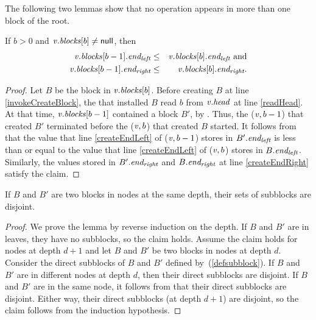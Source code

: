 The following two lemmas show that no operation appears in more than one block of the root.
\begin{lemma} \label{lem::headProgress}
 If $b>0$ and $\mbox{\textnormal{\textit{v}}}.\mbox{\textit{blocks}}[b] \neq \mbox{\sf null}$, then
 \begin{eqnarray*}
 \mbox{\textnormal{\textit{v}}}.\mbox{\textit{blocks}}[b-1].\mbox{\textit{end\textsubscript{left}}} &\leq& \mbox{\textnormal{\textit{v}}}.\mbox{\textit{blocks}}[b].\mbox{\textit{end\textsubscript{left}}} \mbox{ and}\\
 \mbox{\textnormal{\textit{v}}}.\mbox{\textit{blocks}}[b-1].\mbox{\textit{end\textsubscript{right}}} &\leq& \mbox{\textnormal{\textit{v}}}.\mbox{\textit{blocks}}[b].\mbox{\textit{end\textsubscript{right}}}.
 \end{eqnarray*}
\end{lemma}
\begin{proof}
Let $B$ be the block in $\mbox{\textnormal{\textit{v}}}.\mbox{\textit{blocks}}[b]$.
Before creating $B$ at line \ref{invokeCreateBlock}, the  that installed $B$
read $b$ from $\mbox{\textnormal{\textit{v}}}.\mbox{\textit{head}}$ at line \ref{readHead}.
At that time, $\mbox{\textnormal{\textit{v}}}.\mbox{\textit{blocks}}[b-1]$ contained a block $B'$, by .
Thus, the ($\mbox{\textnormal{\textit{v}}},b-1$) that created $B'$ terminated before the ($\mbox{\textnormal{\textit{v}}},b$) that
created $B$ started.
It follows from  that the value that 
line \ref{createEndLeft} of ($\mbox{\textnormal{\textit{v}}},b-1$) stores in $B'.\mbox{\textit{end\textsubscript{left}}}$   
is less than or equal to the value that line \ref{createEndLeft} of ($\mbox{\textnormal{\textit{v}}},b$) 
stores in $B.\mbox{\textit{end\textsubscript{left}}}$.
Similarly, the values stored in $B'.\mbox{\textit{end\textsubscript{right}}}$ and $B.\mbox{\textit{end\textsubscript{right}}}$ at line \ref{createEndRight} 
satisfy the claim.
\end{proof}

\begin{lemma} \label{lem::subblocksDistinct}
If $B$ and $B'$ are two blocks in nodes at the same depth, their sets of subblocks are disjoint.
\end{lemma}
\begin{proof}
We prove the lemma by reverse induction on the depth.
If $B$ and $B'$ are in leaves, they have no subblocks, so the claim holds.
Assume the claim holds for nodes at depth $d+1$ and let $B$ and $B'$ be two blocks in nodes at depth $d$.
Consider the direct subblocks of $B$ and $B'$ defined by~(\ref{defsubblock}).
If $B$ and $B'$ are in different nodes at depth $d$, then their direct subblocks are disjoint.
If $B$ and $B'$ are in the same node, it follows from  that their direct subblocks are disjoint.
Either way, their direct subblocks (at depth $d+1$) are disjoint, so the claim follows from the induction hypothesis.
\end{proof}

